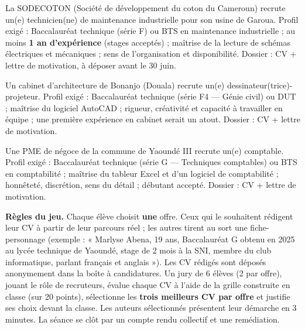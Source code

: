 \documentclass[11pt]{article}
\newcommand{\cle}[1]{{\popxbold\color{popdark}#1}}
\begin{document}
\begin{exemplebox}
La SODECOTON (Société de développement du coton du Cameroun) recrute un(e) technicien(ne) de maintenance industrielle pour son usine de Garoua. Profil exigé : Baccalauréat technique (série F) ou BTS en maintenance industrielle ; au moins \textbf{1 an d'expérience} (stages acceptés) ; maîtrise de la lecture de schémas électriques et mécaniques ; sens de l'organisation et disponibilité. Dossier : CV + lettre de motivation, à déposer avant le 30 juin.
\end{exemplebox}

\begin{exemplebox}
Un cabinet d'architecture de Bonanjo (Douala) recrute un(e) dessinateur(trice)-projeteur. Profil exigé : Baccalauréat technique (série F4 — Génie civil) ou DUT ; maîtrise du logiciel AutoCAD ; rigueur, créativité et capacité à travailler en équipe ; une première expérience en cabinet serait un atout. Dossier : CV + lettre de motivation.
\end{exemplebox}

\begin{exemplebox}
Une PME de négoce de la commune de Yaoundé III recrute un(e) comptable. Profil exigé : Baccalauréat technique (série G — Techniques comptables) ou BTS en comptabilité ; maîtrise du tableur Excel et d'un logiciel de comptabilité ; honnêteté, discrétion, sens du détail ; débutant accepté. Dossier : CV + lettre de motivation.
\end{exemplebox}

\textbf{Règles du jeu.} Chaque élève choisit \textbf{une} offre. Ceux qui le souhaitent rédigent leur CV à partir de leur parcours réel ; les autres tirent au sort une \cle{fiche-personnage} (exemple : « Marlyse Abena, 19 ans, Baccalauréat G obtenu en 2025 au lycée technique de Yaoundé, stage de 2 mois à la SNI, membre du club informatique, parlant français et anglais »). Les CV rédigés sont déposés anonymement dans la \cle{boîte à candidatures}. Un jury de 6 élèves (2 par offre), jouant le rôle de recruteurs, évalue chaque CV à l'aide de la grille construite en classe (sur 20 points), sélectionne les \textbf{trois meilleurs CV par offre} et justifie ses choix devant la classe. Les auteurs sélectionnés présentent leur démarche en 3 minutes. La séance se clôt par un compte rendu collectif et une remédiation.
\end{document}
